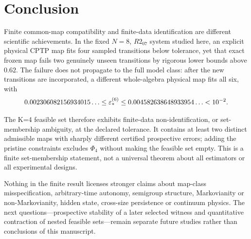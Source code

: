 \section{Conclusion}
\label{sec:conclusion}

Finite common-map compatibility and finite-data identification are different scientific achievements.  In the fixed $N=8$, $R2_{07}$ system studied here, an explicit physical CPTP map fits four sampled transitions below tolerance, yet that exact frozen map fails two genuinely unseen transitions by rigorous lower bounds above $0.62$.  The failure does not propagate to the full model class: after the new transitions are incorporated, a different whole-algebra physical map fits all six, with
\[
0.002306082156934015\ldots
\le\varepsilon_*^{(6)}
\le0.004582638648933954\ldots<10^{-2}.
\]

The K=4 feasible set therefore exhibits finite-data non-identification, or set-membership ambiguity, at the declared tolerance.  It contains at least two distinct admissible maps with sharply different certified prospective errors; adding the pristine constraints excludes $\Phi_4$ without making the feasible set empty.  This is a finite set-membership statement, not a universal theorem about all estimators or all experimental designs.

Nothing in the finite result licenses stronger claims about map-class misspecification, arbitrary-time autonomy, semigroup structure, Markovianity or non-Markovianity, hidden state, cross-size persistence or continuum physics.  The next questions---prospective stability of a later selected witness and quantitative contraction of nested feasible sets---remain separate future studies rather than conclusions of this manuscript.
